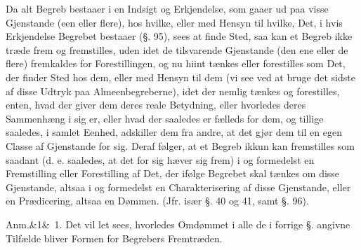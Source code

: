 \documentclass[12pt]{book}
\def\sperr#1{#1}%
\def\textit#1{#1}%
\def\emph#1{#1}%
\newcommand{\sperr}[1]{\textls[180]{#1}}
\newcommand{\anm}[1]{%
  \par\vspace{0.5\baselineskip}%
  \noindent\hspace{\parindent}\sperr{Anm.}\ifx&#1&\else~\textit{#1}.\fi
  \enspace\ignorespaces
}
\newcommand{\opage}[1]{\marginnote{\footnotesize\textit{[#1]}}}
\begin{document}
Da alt Begreb bestaaer i en Indsigt og Erkjendelse, som gaaer ud paa visse Gjenstande
(een eller flere), hos hvilke, eller med Hensyn til hvilke, Det, i hvis Erkjendelse
Begrebet bestaaer (§. 95), sees at finde Sted, saa kan et Begreb ikke træde frem og
fremstilles, uden idet de tilsvarende Gjenstande (den ene eller de flere) fremkaldes
for Forestillingen, og nu hiint tænkes eller forestilles som Det, der finder Sted hos
dem, eller med Hensyn til dem (vi see ved at bruge det sidste af disse \emph{Udtryk}
paa \emph{Almeenbegreberne}), idet der nemlig tænkes og forestilles, enten, hvad der
giver dem deres reale Betydning, eller hvorledes deres Sammenhæng i sig er, eller hvad
der saaledes er fælleds for dem, og tillige saaledes, i samlet Eenhed, adskiller dem
fra andre, at det gjør dem til en egen
\opage{247} Classe af Gjenstande for sig. Deraf følger, at et Begreb ikkun kan fremstilles som
saadant (d. e. saaledes, at det for sig hæver sig frem) i og formedelst en Fremstilling
eller Forestilling af Det, der ifølge Begrebet skal tænkes om disse Gjenstande, altsaa
i og formedelst en \emph{Charakterisering} af disse Gjenstande, eller en
\emph{Prædicering}, altsaa en Dømmen. (Jfr. især §. 40 og 41, samt §. 96).

\anm{1} Det vil let sees, hvorledes Omdømmet i alle de i forrige §. angivne Tilfælde
bliver Formen for Begrebers Fremtræden.
\end{document}
